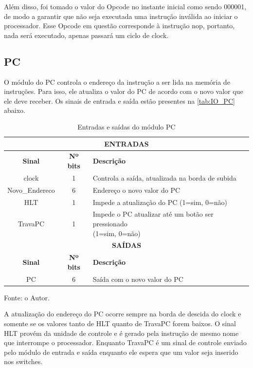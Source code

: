\documentclass[
	12pt,				%
	oneside,
	a4paper,			%
	english,			%
	french,				%
	spanish,			%
	brazil,				%
	]{abntex2}
\begin{document}
Além disso, foi tomado o valor do Opcode no instante inicial como sendo 000001, de modo a garantir que não seja executada uma instrução inválida ao iniciar o processador. Esse Opcode em questão corresponde à instrução nop, portanto, nada será executado, apenas passará um ciclo de clock.

\subsection{PC}

O módulo do PC controla o endereço da instrução a ser lida na memória de instruções. Para isso, ele atualiza o valor do PC de acordo com o novo valor que ele deve receber. Os sinais de entrada e saída estão presentes na \autoref{tab:IO_PC} abaixo.

\setlength{\tabcolsep}{10pt} %
\begin{table}[H]
\centering
\caption{Entradas e saídas do módulo PC}
\label{tab:IO_PC}
\begin{tabular}{|c|c|l|}
\hline
\multicolumn{3}{|c|}{\textbf{ENTRADAS}} \\
\hline
\textbf{Sinal} & \textbf{Nº bits} & \textbf{Descrição} \\
\hline
clock & 1 & Controla a saída, atualizada na borda de subida \\
\hline
Novo\_Endereco & 6 & Endereço o novo valor do PC \\
\hline
HLT & 1 & Impede a atualização do PC (1=sim, 0=não)\\
\hline
TravaPC & 1 & \makecell[l]{Impede o PC atualizar até um botão ser pressionado \\ (1=sim, 0=não)} \\
\hline
\multicolumn{3}{|c|}{\textbf{SAÍDAS}} \\
\hline
\textbf{Sinal} & \textbf{Nº bits} & \textbf{Descrição} \\
\hline
PC & 6 & Saída com o novo valor do PC \\
\hline
\end{tabular}
\vspace{-0.5em}
\begin{center}
Fonte: o Autor.
\end{center}
\end{table} 

A atualização do endereço do PC ocorre sempre na borda de descida do clock e somente se os valores tanto de HLT quanto de TravaPC forem baixos. O sinal HLT provém da unidade de controle e é gerado pela instrução de mesmo nome que interrompe o processador. Enquanto TravaPC é um sinal de controle enviado pelo módulo de entrada e saída enquanto ele espera que um valor seja inserido nos switches.
\end{document}
